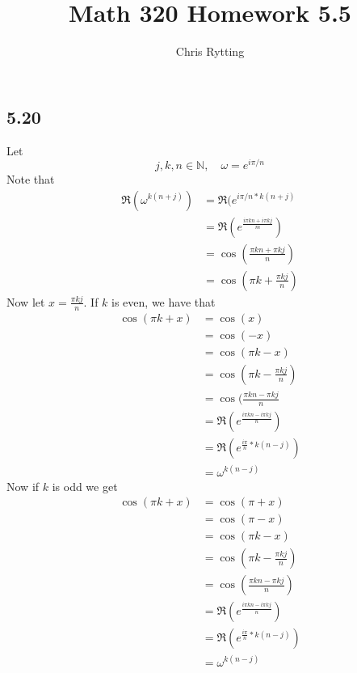\documentclass[letterpaper,12pt]{article}
\theoremstyle{definition}
\begin{document}
\title{Math 320 Homework 5.5}
\author{Chris Rytting}
\maketitle
\subsection*{5.20}
Let \[j, k, n \in \mathbb{N}, \quad \omega = e^{i\pi/n}\] 
Note that 
\begin{align*}
\Re(\omega^{k(n+j)}) &= \Re(e^{i\pi/n*k(n+j)}\\ &= \Re(e^{\frac{i\pi kn + i \pi kj}{m}})\\ &= \cos\left(\frac{\pi k n + \pi k j}{n}\right) \\&= \cos\left(\pi k  + \frac{\pi k j}{n}\right) 
\end{align*}
Now let $x = \frac{\pi k j}{n}$. If $k$ is even, we have that
\begin{align*}
\cos(\pi k + x) &= \cos(x) \\&= \cos(-x) \\&= \cos(\pi k - x) \\&= \cos(\pi k - \frac{\pi k j}{n})
\\&=\cos(\frac{\pi k n - \pi k j}{n} \\&= \Re(e^{\frac{i \pi k n - i \pi k j}{n}}) \\&= \Re(e^{\frac{i \pi}{n}*k(n-j)}) \\&= \omega ^{k(n-j)}
\end{align*}
Now if $k$ is odd we get
\begin{align*}
\cos(\pi k + x) &= \cos(\pi + x) \\&= \cos(\pi -x) \\&= \cos(\pi k - x) \\&= \cos(\pi k - \frac{\pi k j}{n})
\\&= \cos(\frac{\pi k n - \pi k j}{n}) \\&= \Re(e^{\frac{i \pi k n - i \pi k j}{n}}) \\&= \Re(e^{\frac{i \pi}{n}*k(n-j)}) \\&= \omega ^{k(n-j)} 
\end{align*}
\end{document}
